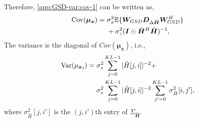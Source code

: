 \documentclass[journal]{IEEEtran}
\begin{document}
Therefore, \eqref{app:GSD-var:cov-1} can be written as,
\begin{equation}
\begin{split}
\text{Cov}(\boldsymbol{\mu}_{\boldsymbol{x}}) = \hspace{0.3em}& \sigma_x^2\mathbb{E}\{\boldsymbol{W}_{GSD} \boldsymbol{D}_{\Delta \hat{\boldsymbol{H}}}{\boldsymbol{W}}_{GSD}^H\} \\
& + \sigma_z^2(\boldsymbol{I}\odot\hat{\boldsymbol{H}}^H \hat{\boldsymbol{H}})^{-1},
\end{split}
\end{equation}
The variance is the diagonal of $Cov(\bm {\mu}_{\bm x})$, i.e.,
\begin{equation}
\begin{split}
\text{Var}({{\mu}_{\boldsymbol{x}}}_i) = \hspace{0.3em}  & \sigma_z^2 \sum_{j=0}^{KL-1} |\hat{H}[j, i]|^{-2} + \\ 
& \sigma_x^2 \sum_{j=0}^{KL-1} |\hat{H}[j, i]|^{-2} \sum_{j'=0}^{KL-1} \sigma^2_{\hat{H}}[i, j'],
\end{split}
\end{equation}
where $\sigma^2_{\hat{H}}[j, i']$ is the $(j, i')$th entry of $\Sigma_{\hat{\bm H}}$.
\end{document}

